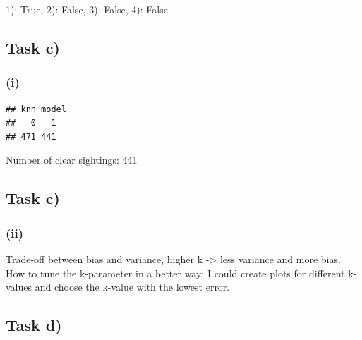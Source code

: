 \documentclass[
]{article}
\newenvironment{Shaded}{\begin{snugshade}}{\end{snugshade}}
\newcommand{\AttributeTok}[1]{\textcolor[rgb]{0.77,0.63,0.00}{#1}}
\newcommand{\ConstantTok}[1]{\textcolor[rgb]{0.00,0.00,0.00}{#1}}
\newcommand{\DecValTok}[1]{\textcolor[rgb]{0.00,0.00,0.81}{#1}}
\newcommand{\FunctionTok}[1]{\textcolor[rgb]{0.00,0.00,0.00}{#1}}
\newcommand{\NormalTok}[1]{#1}
\newcommand{\OtherTok}[1]{\textcolor[rgb]{0.56,0.35,0.01}{#1}}
\newcommand{\SpecialCharTok}[1]{\textcolor[rgb]{0.00,0.00,0.00}{#1}}
\begin{document}
1): True, 2): False, 3): False, 4): False

\hypertarget{task-c}{%
\subsection{Task c)}\label{task-c}}

\hypertarget{i-3}{%
\subsubsection{(i)}\label{i-3}}

\begin{Shaded}
\end{Shaded}

\begin{verbatim}
## knn_model
##   0   1 
## 471 441
\end{verbatim}

Number of clear sightings: 441

\hypertarget{task-c-1}{%
\subsection{Task c)}\label{task-c-1}}

\hypertarget{ii-4}{%
\subsubsection{(ii)}\label{ii-4}}

Trade-off between bias and variance, higher k -\textgreater{} less
variance and more bias. How to tune the k-parameter in a better way: I
could create plots for different k-values and choose the k-value with
the lowest error.

\hypertarget{task-d}{%
\subsection{Task d)}\label{task-d}}
\end{document}
